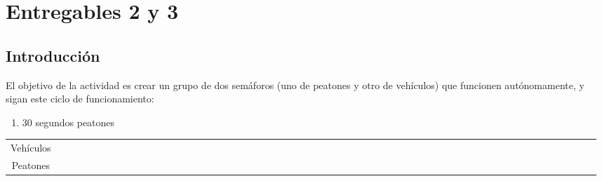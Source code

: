 \documentclass{article}
\newcommand{\trojo}{\cellcolor{red!75}}
\newcommand{\tambr}{\cellcolor{yellow!75}}
\begin{document}
\section*{Entregables 2 y 3}
\subsection*{Introducción}
El objetivo de la actividad es crear un grupo de dos semáforos (uno de peatones y otro de vehículos)
que funcionen autónomamente, y sigan este ciclo de funcionamiento:
\begin{enumerate}
    \item $30$ segundos peatones
\end{enumerate}
\begin{tabular}{c ccccccccccccccccccccccccccccccccccccccccccccccccccccccc}
    Vehículos &
    \trojo&\trojo&\trojo&\trojo&\trojo& \trojo&\trojo&\trojo&\trojo&\trojo&
    \trojo&\trojo&\trojo&\trojo&\trojo& \trojo&\trojo&\trojo&\trojo&\trojo&
    \trojo&\trojo&\trojo&\trojo&\trojo& \trojo&\trojo&\trojo&\trojo&\trojo&
    \tambr&\tambr&\tambr&\tambr&\tambr& \trojo&\trojo&\trojo&\trojo&\trojo&
    \trojo&\trojo&\trojo&\trojo&\trojo& \trojo&\trojo&\trojo&\trojo&\trojo&
    \trojo&\trojo&\trojo&\trojo&\trojo \\
    Peatones &
    \trojo&\trojo&\trojo&\trojo&\trojo& \trojo&\trojo&\trojo&\trojo&\trojo&
    \trojo&\trojo&\trojo&\trojo&\trojo& \trojo&\trojo&\trojo&\trojo&\trojo&
    \trojo&\trojo&\trojo&\trojo&\trojo& \trojo&\trojo&\trojo&\trojo&\trojo&
    \trojo&\trojo&\trojo&\trojo&\trojo& \trojo&\trojo&\trojo&\trojo&\trojo&
    \trojo&\trojo&\trojo&\trojo&\trojo& \trojo&\trojo&\trojo&\trojo&\trojo&
    \trojo&\trojo&\trojo&\trojo&\trojo
\end{tabular}
\end{document}
